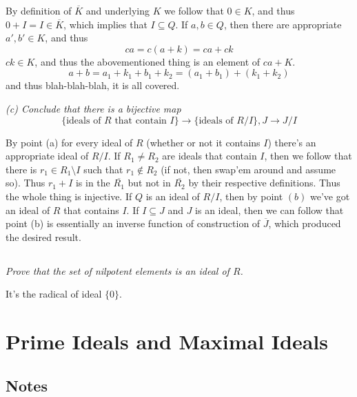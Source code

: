 \documentclass[11pt,oneside,titlepage]{book}
\newcommand{\set}[1]{\{ #1 \}}
\begin{document}
By definition of $\overline{K}$ and  underlying $K$ we follow that
$0 \in K$, and thus $0 + I = I \in \overline{K}$, which implies that
$I \subseteq Q$. If $a, b \in Q$, then there are appropriate $a', b' \in K$,
and thus
$$ca = c (a + k) = ca + ck$$
$ck \in K$, and thus the abovementioned thing is an element of $ca + K$.
$$a + b = a_1 + k_1 + b_1 + k_2 = (a_1 + b_1) + (k_1 + k_2)$$
and thus blah-blah-blah, it is all covered.

\textit{(c) Conclude that there is  a bijective map
  $$ \set{\text{ideals of }R\text{ that contain } I} \to \set{\text{ideals of }R/I}, J \to J/I$$}

By point (a) for every ideal of $R$ (whether or not it contains $I$)
there's an appropriate ideal of $R/I$. If $R_1 \neq R_2$ are ideals that contain $I$,
then we follow that there is $r_1 \in R_1 \setminus I$ such that $r_1 \notin R_2$
(if not, then swap'em around and assume so). Thus $r_1 + I$ is in the $\overline{R_1}$
but not in $\overline{R_2}$ by their respective definitions. Thus the whole thing
is injective. If $Q$ is an ideal of $R/I$, then by point $(b)$ we've got an ideal of
$R$ that contains $I$. If $I \subseteq J$ and $J$ is an ideal, then we
can follow that point (b) is essentially an inverse function of
construction of $\overline{J}$, which produced the desired result.


\subsection{}

\textit{Prove that the set of nilpotent elements is an ideal of $R$.}

It's the radical of ideal $\set{0}$.

\section{Prime Ideals and Maximal Ideals}

\subsection*{Notes}
\end{document}
